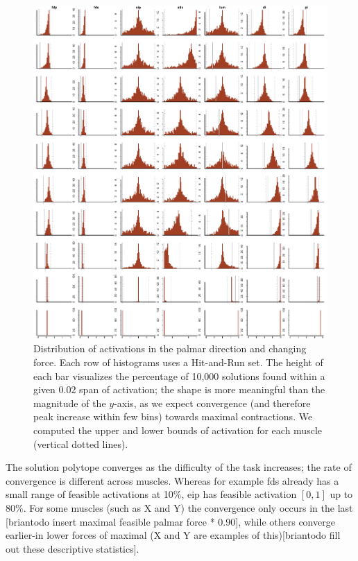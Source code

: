 \begin{figure}[htbp]
\centering
\includegraphics[width=\textwidth]{figs/Z_alphaProgression1430924065026.pdf}
\caption{Distribution of activations in the palmar direction and changing force. Each row of histograms uses a Hit-and-Run set. The height of each bar visualizes the percentage of 10,000 solutions found within a given 0.02 span of activation; the shape is more meaningful than the magnitude of the $y$-axis, as we expect convergence (and therefore peak increase within few bins) towards maximal contractions. We computed the upper and lower bounds of activation for each muscle (vertical dotted lines).}
\label{fig:Z_progression}
\end{figure}%

The solution polytope converges as the difficulty of the task increases; the rate of convergence is different across muscles. Whereas for example fds already has a small range of feasible activations at 10\%, eip has feasible activation $[0,1]$ up to 80\%.  For some muscles (such as X and Y) the convergence only occurs in the last [briantodo insert maximal feasible palmar force * 0.90], while others converge earlier-in lower forces of maximal (X and Y are examples of this)[briantodo fill out these descriptive statistics].


